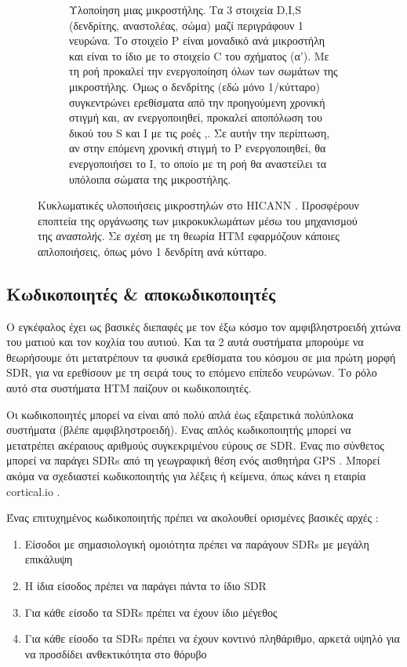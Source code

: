 \begin{figure}[t]
\begin{subfigure}[t]{0.49\textwidth}
			\caption[κυκλωματική υλοποίηση μικροστήλης]{Υλοποίηση μιας μικροστήλης.
			Τα 3 στοιχεία D,I,S (δενδρίτης, αναστολέας, σώμα) μαζί περιγράφουν 1 νευρώνα.
			Το στοιχείο P είναι μοναδικό ανά μικροστήλη και είναι το ίδιο με το στοιχείο C του σχήματος (α').
			Με τη ροή  προκαλεί την ενεργοποίηση όλων των σωμάτων της μικροστήλης.
			Όμως ο δενδρίτης (εδώ μόνο 1/κύτταρο) συγκεντρώνει ερεθίσματα από την προηγούμενη χρονική στιγμή και, αν ενεργοποιηθεί,
			προκαλεί αποπόλωση του δικού του S και I με τις ροές ,.
			Σε αυτήν την περίπτωση, αν στην επόμενη χρονική στιγμή το P ενεργοποιηθεί, θα ενεργοποιήσει το I,
			το οποίο με τη ροή  θα αναστείλει τα υπόλοιπα σώματα της μικροστήλης.
			}
			\label{fig:minicolumn_circ}
		\end{subfigure}
		\caption[κυκλωματικές υλοποιήσεις μικροστηλών στο HICANN]{Κυκλωματικές υλοποιήσεις μικροστηλών στο HICANN \parencite{meierMixedsignalUniversalNeuromorphic2015}.
		Προσφέρουν εποπτεία της οργάνωσης των μικροκυκλωμάτων μέσω του μηχανισμού της \textit{αναστολής}.
		Σε σχέση με τη θεωρία HTM εφαρμόζουν κάποιες απλοποιήσεις, όπως μόνο 1 δενδρίτη ανά κύτταρο.
		\parencite[πηγή][]{billaudellePortingHTMModels2015}}
	\end{figure}


\subsection{Κωδικοποιητές \& αποκωδικοποιητές}

	Ο εγκέφαλος έχει ως βασικές διεπαφές με τον έξω κόσμο τον αμφιβληστροειδή χιτώνα του ματιού και τον κοχλία του αυτιού.
	Και τα 2 αυτά συστήματα μπορούμε να θεωρήσουμε ότι μετατρέπουν τα φυσικά ερεθίσματα του κόσμου σε μια πρώτη μορφή SDR,
	για να ερεθίσουν με τη σειρά τους το επόμενο επίπεδο νευρώνων.
	Το ρόλο αυτό στα συστήματα HTM παίζουν οι κωδικοποιητές.

	Οι κωδικοποιητές μπορεί να είναι από πολύ απλά έως εξαιρετικά πολύπλοκα συστήματα (βλέπε αμφιβληστροειδή).
	Ενας απλός κωδικοποιητής μπορεί να μετατρέπει ακέραιους αριθμούς συγκεκριμένου εύρους σε SDR.
	Ένας πιο σύνθετος μπορεί να παράγει SDRs από τη γεωγραφική θέση ενός αισθητήρα GPS \parencite{purdyEncodingDataHTM2016}.
	Μπορεί ακόμα να σχεδιαστεί κωδικοποιητής για λέξεις ή κείμενα, όπως κάνει η εταιρία cortical.io \parencite{semantic}.

	Ένας επιτυχημένος κωδικοποιητής πρέπει να ακολουθεί ορισμένες βασικές αρχές \parencite{purdyEncodingDataHTM2016}:
	\begin{enumerate}
		\item Είσοδοι με σημασιολογική ομοιότητα πρέπει να παράγουν SDRs με μεγάλη επικάλυψη
		\item Η ίδια είσοδος πρέπει να παράγει πάντα το ίδιο SDR
		\item Για κάθε είσοδο τα SDRs πρέπει να έχουν ίδιο μέγεθος
		\item Για κάθε είσοδο τα SDRs πρέπει να έχουν κοντινό πληθάριθμο, αρκετά υψηλό για να προσδίδει ανθεκτικότητα στο θόρυβο
	\end{enumerate}

